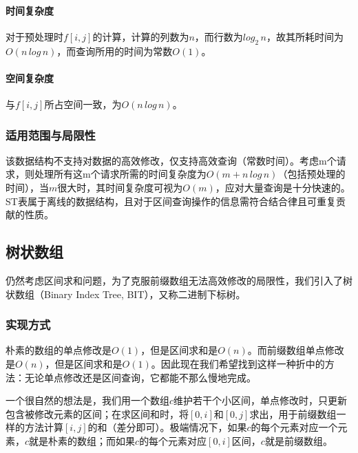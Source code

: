 \documentclass{cjc}
\begin{document}
\paragraph{时间复杂度} 对于预处理时$f[i,j]$的计算，计算的列数为$n$，而行数为$log_2\,n$，故其所耗时间为$O(n\, log \, n)$，而查询所用的时间为常数$O(1)$。
\paragraph{空间复杂度} 与$f[i,j]$所占空间一致，为$O(n\, log \, n)$。
\subsubsection{适用范围与局限性}

该数据结构不支持对数据的高效修改，仅支持高效查询（常数时间）。考虑m个请求，则处理所有这m个请求所需的时间复杂度为$O(m+n\, log \, n)$（包括预处理的时间），当$m$很大时，其时间复杂度可视为$O(m)$，应对大量查询是十分快速的。ST表属于离线的数据结构，且对于区间查询操作的信息需符合结合律且可重复贡献的性质。

\subsection{树状数组}
仍然考虑区间求和问题，为了克服前缀数组无法高效修改的局限性，我们引入了树状数组（Binary Index Tree, BIT），又称二进制下标树。
\subsubsection{实现方式}
朴素的数组的单点修改是$O(1)$，但是区间求和是$O(n)$。而前缀数组单点修改是$O(n)$，但是区间求和是$O(1)$。因此现在我们希望找到这样一种折中的方法：无论单点修改还是区间查询，它都能不那么慢地完成。

一个很自然的想法是，我们用一个数组$c$维护若干个小区间，单点修改时，只更新包含被修改元素的区间；在求区间和时，将$[0,i]$和$[0,j]$求出，用于前缀数组一样的方法计算$[i,j]$的和（差分即可）。极端情况下，如果$c$的每个元素对应一个元素，$c$就是朴素的数组；而如果$c$的每个元素对应$[0,i]$区间，$c$就是前缀数组。
\end{document}
